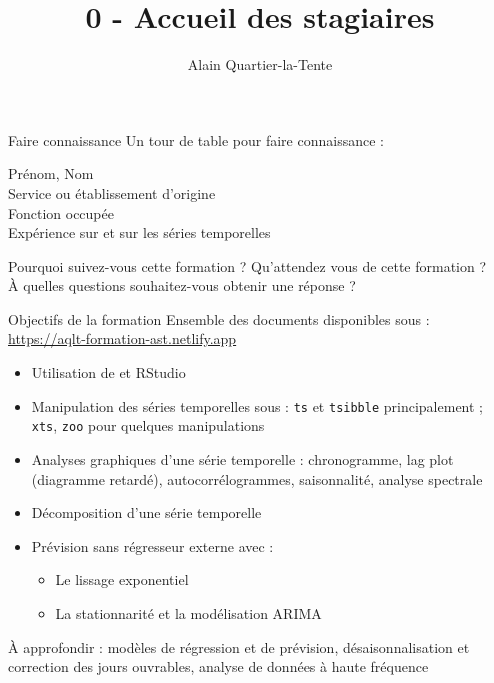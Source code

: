 \documentclass[10pt,xcolor=table,color={dvipsnames,usenames},ignorenonframetext,usepdftitle=false,french]{beamer}
\title{0 - Accueil des stagiaires}
\author{Alain Quartier-la-Tente}
\date{}
\begin{document}

\begin{frame}{Faire connaissance}
\protect\hypertarget{faire-connaissance}{}
Un tour de table pour faire connaissance :

Prénom, Nom\\
Service ou établissement d'origine\\
Fonction occupée\\
Expérience sur  et sur les séries temporelles

Pourquoi suivez-vous cette formation ? Qu'attendez vous de cette
formation ?\\
À quelles questions souhaitez-vous obtenir une réponse ?
\end{frame}

\begin{frame}[fragile]{Objectifs de la formation}
\protect\hypertarget{objectifs-de-la-formation}{}
Ensemble des documents disponibles sous :
\url{https://aqlt-formation-ast.netlify.app}

\begin{itemize}
\item
  Utilisation de  et RStudio
\item
  Manipulation des séries temporelles sous  :
  \texttt{ts} et \texttt{tsibble} principalement ; \texttt{xts},
  \texttt{zoo} pour quelques manipulations
\item
  Analyses graphiques d'une série temporelle : chronogramme, lag plot
  (diagramme retardé), autocorrélogrammes, saisonnalité, analyse
  spectrale
\item
  Décomposition d'une série temporelle
\item
  Prévision sans régresseur externe avec :

  \begin{itemize}
  \item
    Le lissage exponentiel
  \item
    La stationnarité et la modélisation ARIMA
  \end{itemize}
\end{itemize}

\pause

\bcinfo À approfondir : modèles de régression et de prévision,
désaisonnalisation et correction des jours ouvrables, analyse de données
à haute fréquence
\end{frame}
\end{document}
